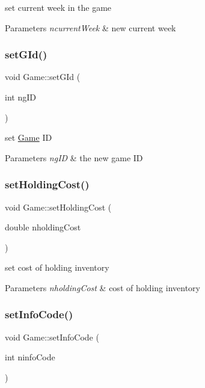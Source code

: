 set current week in the game 
\begin{DoxyParams}{Parameters}
{\em ncurrent\+Week} & new current week \\
\hline
\end{DoxyParams}
\mbox{\label{classGame_a28f1e26b5927dcf6deaf9c7c2fa2d1d3}} 
\subsubsection{\texorpdfstring{set\+G\+Id()}{setGId()}}
{\footnotesize\ttfamily void Game\+::set\+G\+Id (\begin{DoxyParamCaption}\item[{int}]{ng\+ID }\end{DoxyParamCaption})}

set \hyperlink{classGame}{Game} ID 
\begin{DoxyParams}{Parameters}
{\em ng\+ID} & the new game ID \\
\hline
\end{DoxyParams}
\mbox{\label{classGame_a469b669f532f987678463cff63a3d872}} 
\subsubsection{\texorpdfstring{set\+Holding\+Cost()}{setHoldingCost()}}
{\footnotesize\ttfamily void Game\+::set\+Holding\+Cost (\begin{DoxyParamCaption}\item[{double}]{nholding\+Cost }\end{DoxyParamCaption})}

set cost of holding inventory 
\begin{DoxyParams}{Parameters}
{\em nholding\+Cost} & cost of holding inventory \\
\hline
\end{DoxyParams}
\mbox{\label{classGame_a886bd4bd86fb77831438cc0b2acd5e96}} 
\subsubsection{\texorpdfstring{set\+Info\+Code()}{setInfoCode()}}
{\footnotesize\ttfamily void Game\+::set\+Info\+Code (\begin{DoxyParamCaption}\item[{int}]{ninfo\+Code }\end{DoxyParamCaption})}

